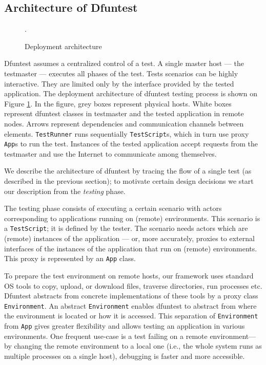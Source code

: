 \subsection{Architecture of Dfuntest}

\begin{figure}[tbp]
  \centering
  \def\svgwidth{\columnwidth}
  \scriptsize {
  
}
\caption{Deployment architecture}
\label{fig:4_deployment_architecture}.
\end{figure}

Dfuntest assumes a centralized control of a test. A single master
host --- the testmaster --- executes all phases of the test.
Tests scenarios can be highly interactive.
They are limited only by the interface provided by the tested application.
The deployment architecture of dfuntest testing process is shown on Figure \ref{fig:4_deployment_architecture}.
In the figure, grey boxes represent physical hosts.
White boxes represent dfuntest classes in testmaster and the tested application in remote nodes.
Arrows represent dependencies and communication channels between elements. 
\texttt{TestRunner} runs sequentially \texttt{TestScript}s, which in turn use proxy \texttt{App}s to run the test.
Instances of the tested application accept requests from the testmaster and use the Internet to communicate among themselves.

We describe the architecture of dfuntest by tracing the flow of a single test (as
described in the previous section); to motivate certain design decisions we
start our description from the \emph{testing} phase.

The testing phase consists of executing a certain scenario with actors
corresponding to applications running on (remote) environments.
This scenario is a \texttt{TestScript}; it is defined by the tester. The
scenario needs actors which are (remote) instances of the application --- or, more
accurately, proxies to external interfaces of the instances of the application that run on (remote) 
environments.
This proxy is represented by an \texttt{App} class.

To prepare the test environment on remote hosts, our framework uses standard OS
tools to copy, upload, or download files, traverse directories, run processes
etc.  Dfuntest abstracts from concrete implementations of these tools by a proxy
class \texttt{Environment}.
An abstract \texttt{Environment} enables dfuntest to abstract from where the
environment is located or how it is accessed.
This separation of \texttt{Environment} from \texttt{App} gives greater
flexibility and allows testing an application in various environments.
One frequent use-case is a test failing on a remote environment---by changing
the remote environment to a local one (i.e., the whole system runs as multiple
processes on a single host), debugging is faster and more accessible.

